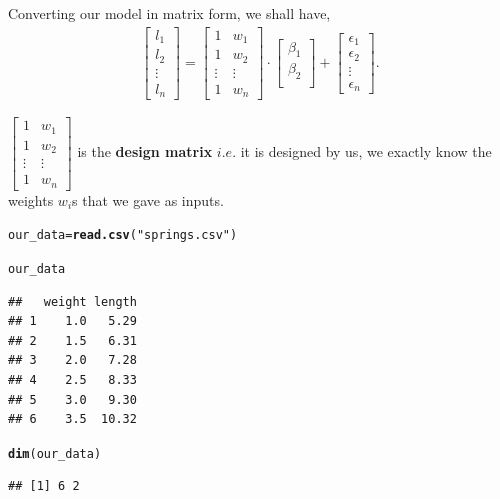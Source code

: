\documentclass[11pt, a4paper]{article}\usepackage[]{graphicx}\usepackage[]{xcolor}
\makeatletter
\newcommand{\hlsng}[1]{\textcolor[rgb]{0.192,0.494,0.8}{#1}}%
\newcommand{\hldef}[1]{\textcolor[rgb]{0.345,0.345,0.345}{#1}}%
\newcommand{\hlkwb}[1]{\textcolor[rgb]{0.69,0.353,0.396}{#1}}%
\newcommand{\hlkwd}[1]{\textcolor[rgb]{0.737,0.353,0.396}{\textbf{#1}}}%
\newenvironment{kframe}{%
 \def\at@end@of@kframe{}%
 \ifinner\ifhmode%
  \def\at@end@of@kframe{\end{minipage}}%
  \begin{minipage}{\columnwidth}%
 \fi\fi%
 \def\FrameCommand##1{\hskip\@totalleftmargin \hskip-\fboxsep
 \colorbox{shadecolor}{##1}\hskip-\fboxsep
     \hskip-\linewidth \hskip-\@totalleftmargin \hskip\columnwidth}%
 \MakeFramed {\advance\hsize-\width
   \@totalleftmargin\z@ \linewidth\hsize
   \@setminipage}}%
 {\par\unskip\endMakeFramed%
 \at@end@of@kframe}
\newenvironment{knitrout}{}{} %
\makeatother
\begin{document}
Converting our model in matrix form, we shall have,
\begin{gather}
	\begin{bmatrix} l_1 \\	l_2 \\	\vdots \\	l_n	\end{bmatrix}
	=
	\begin{bmatrix}	1 & w_1 \\	1 & w_2 \\	\vdots & \vdots \\	1 & w_n	\end{bmatrix} 
	\cdot
	\begin{bmatrix}	\beta_1 \\	\beta_2 \\	\end{bmatrix}  
	+	
	\begin{bmatrix}  \epsilon_1 \\	\epsilon_2 \\	\vdots \\	\epsilon_n	\end{bmatrix}.
\end{gather}

$ \begin{bmatrix}	1 & w_1 \\	1 & w_2 \\	\vdots & \vdots \\	1 & w_n	\end{bmatrix} $ is the \textbf{design matrix} $i.e.$ it is designed by us, we exactly know the weights $w_i$s that we gave as inputs.

\begin{knitrout}
\color{fgcolor}\begin{kframe}
\begin{alltt}
\hldef{our_data} \hlkwb{=} \hlkwd{read.csv}\hldef{(}\hlsng{"springs.csv"}\hldef{)}

\hldef{our_data}
\end{alltt}
\begin{verbatim}
##   weight length
## 1    1.0   5.29
## 2    1.5   6.31
## 3    2.0   7.28
## 4    2.5   8.33
## 5    3.0   9.30
## 6    3.5  10.32
\end{verbatim}
\begin{alltt}
\hlkwd{dim}\hldef{(our_data)}
\end{alltt}
\begin{verbatim}
## [1] 6 2
\end{verbatim}
\end{kframe}
\end{knitrout}
\end{document}
